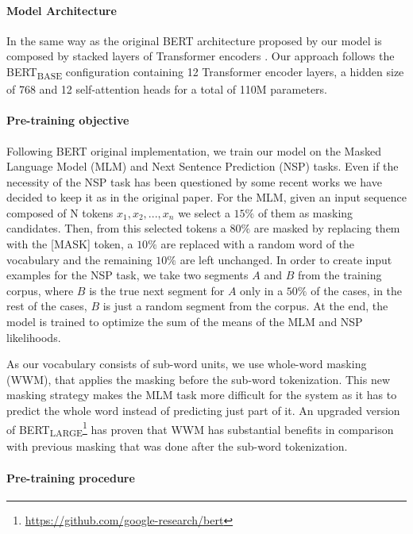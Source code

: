 \documentclass[10pt, a4paper]{article}
\begin{document}
\paragraph{Model Architecture}

In the same way as the original BERT architecture proposed by  our model is composed by stacked layers of Transformer encoders \cite{vaswani2017attention}. Our approach follows the BERT\textsubscript{BASE} configuration containing 12 Transformer encoder layers, a hidden size of 768 and 12 self-attention heads for a total of 110M parameters. 

\paragraph{Pre-training objective}

Following BERT original implementation, we train our model on the Masked Language Model (MLM) and Next Sentence Prediction (NSP) tasks. Even if the necessity of the NSP task has been questioned by some recent works \cite{yang2019xlnet,liu2019roberta,lample2019cross} we have decided to keep it as in the original paper. For the MLM, given an input sequence composed of N tokens $x_1, x_2, ..., x_n$ we select a $15\%$ of them as masking candidates. Then, from this selected tokens a $80\%$ are masked by replacing them with the [MASK] token, a $10\%$ are replaced with a random word of the vocabulary and the remaining $10\%$ are left unchanged. In order to create input examples for the NSP task, we take two segments $A$ and $B$ from the training corpus, where $B$ is the true next segment for $A$ only in a $50\%$ of the cases, in the rest of the cases, $B$ is just a random segment from the corpus. At the end, the model is trained to optimize the sum of the means of the MLM and NSP likelihoods.

As our vocabulary consists of sub-word units, we use whole-word masking (WWM), that applies the masking before the sub-word tokenization. This new masking strategy makes the MLM task more difficult for the system as it has to predict the whole word instead of predicting just part of it. An upgraded version of BERT\textsubscript{LARGE}\footnote{\url{https://github.com/google-research/bert}} has proven that WWM has substantial benefits in comparison with previous masking that was done after the sub-word tokenization. 

\paragraph{Pre-training procedure}
\end{document}

